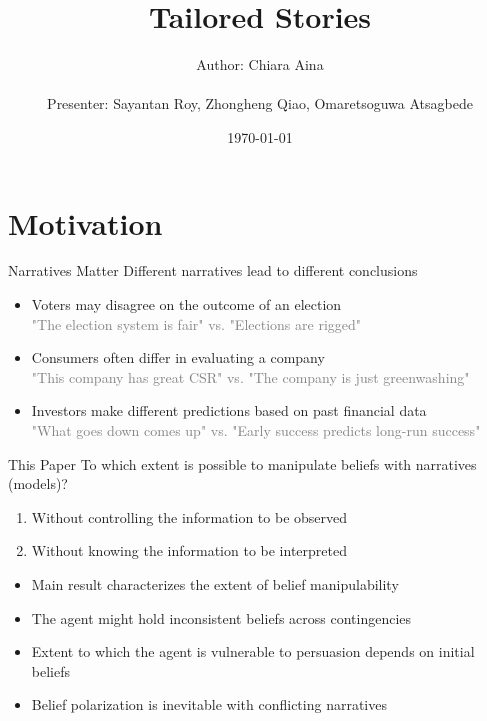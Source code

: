 \documentclass[aspectratio=169]{beamer}
\title{Tailored Stories}
\author{Author: Chiara Aina \\ \vspace{0.8cm} \\ Presenter: Sayantan Roy, Zhongheng Qiao, Omaretsoguwa Atsagbede}
\date{\today}
\theoremstyle{definition}
\theoremstyle{plain}
\theoremstyle{plain}
\theoremstyle{definition}
\theoremstyle{plain}
\theoremstyle{plain}
\theoremstyle{plain}
\theoremstyle{plain}
\theoremstyle{remark}
\theoremstyle{definition}
\begin{document}
\begin{frame}
  \maketitle
\end{frame}

\section{Motivation}

\begin{frame}{Narratives Matter}
Different narratives lead to different conclusions
  \begin{itemize}
    \item Voters may disagree on the outcome of an election \\ 
     \textcolor{gray}{\small "The election system is fair" vs. "Elections are rigged"}
    \item Consumers often differ in evaluating a company \\
     \textcolor{gray}{\small "This company has great CSR" vs. "The company is just greenwashing"}
    \item Investors make different predictions based on past financial data \\
      \textcolor{gray}{\small "What goes down comes up" vs. "Early success predicts long-run success"}
  \end{itemize}
\end{frame}

\begin{frame}{This Paper}
To which extent is possible to manipulate beliefs with narratives (models)?
  \begin{enumerate}
    \item Without controlling the information to be observed
    \item Without knowing the information to be interpreted 
  \end{enumerate}
  
  \begin{itemize}
    \item Main result characterizes the extent of belief manipulability
    \item The agent might hold inconsistent beliefs across contingencies
    \item Extent to which the agent is vulnerable to persuasion depends on initial beliefs
    \item Belief polarization is inevitable with conflicting narratives
  \end{itemize}
\end{frame}
\end{document}
